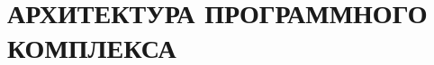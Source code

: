 \documentclass[a4paper,14pt,russian]{extreport}
\begin{document}
    \chapter{АРХИТЕКТУРА ПРОГРАММНОГО КОМПЛЕКСА}
    
%    
%    
%    
%    
%    
%    
%    
%    
%    
%    
    
    \newpage
    
    
    \newpage
    
    
\end{document}
